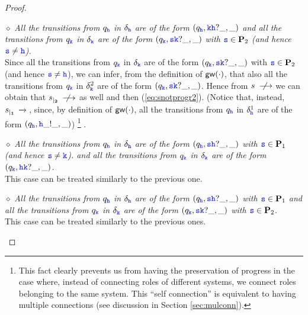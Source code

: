 \begin{proof}
\begin{description}
\underline{$\diamond$} 
{\em  All the transitions from $q_\HH$ in $\delta_\HH$ are of the form $(q_\HH,\KK\HH?\_,\_)$ and
all the transitions from $q_\KK$ in $\delta_\KK$ are of the form $(q_\KK,\tts\KK?\_,\_)$ with $\tts \in \roles_2$ (and hence $\tts\neq\HH$).}\\
Since all the transitions from $q_\KK$ in $\delta_\KK$ are of the form $(q_\KK,\tts\KK?\_,\_)$ with $\tts \in \roles_2$ (and hence $\tts\neq\HH$),
  we can infer, from the definition of  $\gateway{\cdot}$, that also  all the transitions from $q_\KK$ in $\delta^2_\KK$ are of the form $(q_\KK,\tts\KK?\_,\_)$. Hence from $s\notlts{}$ we can  
obtain that $\restrict{s}{2}\notlts{}$ as well and then  (\ref{eq:snotprogr2}).
(Notice that, instead, $\restrict{s}{1}\lts{}$, since, by definition of $\gateway{\cdot}$, all the transitions from 
$q_\HH$ in $\delta^1_\HH$ are of the form $(q_\HH,\HH\_!\_,\_)$)\!
\footnote{This fact clearly prevents us from having the preservation of progress in the case where, instead of connecting roles of
different systems, we connect roles belonging to the same system. This ``self connection'' is equivalent to having multiple connections 
(see discussion in Section \ref{sec:mulconn}). }
.

\underline{$\diamond$} 
{\em All the transitions from $q_\HH$ in $\delta_\HH$ are of the form $(q_\HH,\tts\HH?\_,\_)$ with $\tts \in \roles_1$ (and hence $\tts\neq\KK$). and
all the transitions from $q_\KK$ in $\delta_\KK$ are of the form $(q_\KK,\HH\KK?\_,\_)$.}\\
This case can be treated similarly to the previous one.


\underline{$\diamond$} 
{\em  All the transitions from $q_\HH$ in $\delta_\HH$ are of the form $(q_\HH,\tts\HH?\_,\_)$ with $\tts\in\roles_1$ and
all the transitions from $q_\KK$ in $\delta_\KK$ are of the form $(q_\KK,\tts\KK?\_,\_)$ with $\tts\in\roles_2$.}\\
This case can be treated similarly to the previous ones.



\end{description}
\end{proof}
